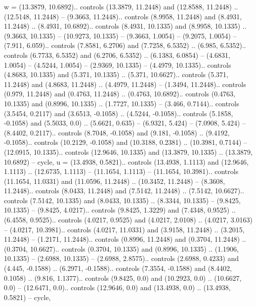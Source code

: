 w = {(13.3879, 10.6892).. controls (13.3879, 11.2448) and (12.8588, 11.2448) .. (12.5148, 11.2448) -- (9.3663, 11.2448).. controls (8.9958, 11.2448) and (8.4931, 11.2448) .. (8.4931, 10.6892).. controls (8.4931, 10.1335) and (8.9958, 10.1335) .. (9.3663, 10.1335) -- (10.9273, 10.1335) -- (9.3663, 1.0054) -- (9.2075, 1.0054) -- (7.911, 6.059).. controls (7.8581, 6.2706) and (7.7258, 6.5352) .. (6.985, 6.5352).. controls (6.7733, 6.5352) and (6.2706, 6.5352) .. (6.1383, 6.0854) -- (4.6831, 1.0054) -- (4.5244, 1.0054) -- (2.9369, 10.1335) -- (4.4979, 10.1335).. controls (4.8683, 10.1335) and (5.371, 10.1335) .. (5.371, 10.6627).. controls (5.371, 11.2448) and (4.8683, 11.2448) .. (4.4979, 11.2448) -- (1.3494, 11.2448).. controls (0.979, 11.2448) and (0.4763, 11.2448) .. (0.4763, 10.6892).. controls (0.4763, 10.1335) and (0.8996, 10.1335) .. (1.7727, 10.1335) -- (3.466, 0.7144).. controls (3.5454, 0.2117) and (3.6513, -0.1058) .. (4.5244, -0.1058).. controls (5.1858, -0.1058) and (5.5033, 0.0) .. (5.6621, 0.635) -- (6.9321, 5.424) -- (7.0908, 5.424) -- (8.4402, 0.2117).. controls (8.7048, -0.1058) and (9.181, -0.1058) .. (9.4192, -0.1058).. controls (10.2129, -0.1058) and (10.3188, 0.2381) .. (10.3981, 0.7144) -- (12.0915, 10.1335).. controls (12.9646, 10.1335) and (13.3879, 10.1335) .. (13.3879, 10.6892) -- cycle},
u = {(13.4938, 0.5821).. controls (13.4938, 1.1113) and (12.9646, 1.1113) .. (12.6735, 1.1113) -- (11.1654, 1.1113) -- (11.1654, 10.3981).. controls (11.1654, 11.0331) and (11.0596, 11.2448) .. (10.3452, 11.2448) -- (8.3608, 11.2448).. controls (8.0433, 11.2448) and (7.5142, 11.2448) .. (7.5142, 10.6627).. controls (7.5142, 10.1335) and (8.0433, 10.1335) .. (8.3344, 10.1335) -- (9.8425, 10.1335) -- (9.8425, 4.0217).. controls (9.8425, 1.3229) and (7.4348, 0.9525) .. (6.4558, 0.9525).. controls (4.0217, 0.9525) and (4.0217, 2.0108) .. (4.0217, 3.0163) -- (4.0217, 10.3981).. controls (4.0217, 11.0331) and (3.9158, 11.2448) .. (3.2015, 11.2448) -- (1.2171, 11.2448).. controls (0.8996, 11.2448) and (0.3704, 11.2448) .. (0.3704, 10.6627).. controls (0.3704, 10.1335) and (0.8996, 10.1335) .. (1.1906, 10.1335) -- (2.6988, 10.1335) -- (2.6988, 2.8575).. controls (2.6988, 0.4233) and (4.445, -0.1588) .. (6.2971, -0.1588).. controls (7.3554, -0.1588) and (8.4402, 0.1058) .. (9.816, 1.1377).. controls (9.8425, 0.0) and (10.2923, 0.0) .. (10.6627, 0.0) -- (12.6471, 0.0).. controls (12.9646, 0.0) and (13.4938, 0.0) .. (13.4938, 0.5821) -- cycle},
